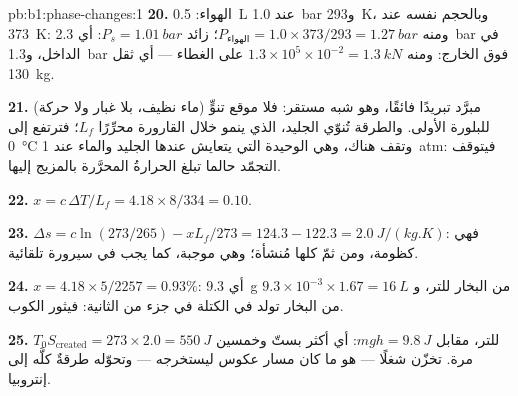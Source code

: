 \begin{solution}{pb:b1:phase-changes:1}
\textbf{20.} الهواء: \qty{0.5}{L} عند \qty{1.0}{bar} و\qty{293}{K}، وبالحجم نفسه عند
\qty{373}{K}: ومنه $P_{\text{الهواء}} = 1.0 \times 373/293 = \qty{1.27}{bar}$؛ زائد
$P_s = \qty{1.01}{bar}$: أي \qty{2.3}{bar} في الداخل، و\qty{1.3}{bar} فوق
الخارج: ومنه $1.3 \times 10^5 \times 10^{-2} = \qty{1.3}{kN}$ على الغطاء --- أي
ثقل \qty{130}{kg}.

\textbf{21.} مبرَّد تبريدًا فائقًا، وهو شبه مستقر: فلا موقع تنوٍّ (ماء نظيف،
بلا غبار ولا حركة) للبلورة الأولى. والطرقة تُنوّي الجليد، الذي
ينمو خلال القارورة محرِّرًا $L_f$؛ فترتفع  إلى
\qty{0}{\degreeCelsius} وتقف هناك، وهي  الوحيدة التي يتعايش عندها الجليد
والماء عند \qty{1}{atm}: فيتوقف التجمّد حالما تبلغ
الحرارةُ المحرَّرة بالمزيج إليها.

\textbf{22.} $x = c\,\Delta T/L_f = 4.18 \times 8/334 = 0.10$.

\textbf{23.} $\Delta s = c\ln(273/265) - xL_f/273 = 124.3 - 122.3 =
\qty{+2.0}{J/(kg.K)}$: فهي كظومة، ومن ثمّ كلها مُنشأة؛ وهي موجبة، كما يجب
في سيرورة تلقائية.

\textbf{24.} $x = 4.18 \times 5/2257 = 0.93\%$: أي \qty{9.3}{g} من البخار للتر،
و $9.3 \times 10^{-3} \times 1.67 = \qty{16}{L}$ من البخار تولد في الكتلة في
جزء من الثانية: فيثور الكوب.

\textbf{25.} $T_0S_{\mathrm{created}} = 273 \times 2.0 = \qty{550}{J}$ للتر،
مقابل $mgh = \qty{9.8}{J}$: أي أكثر بستّ وخمسين مرة. 
تخزّن شغلًا --- هو ما كان مسار عكوس ليستخرجه --- وتحوّله
طرقةٌ كلَّه إلى إنتروبيا.
\end{solution}
